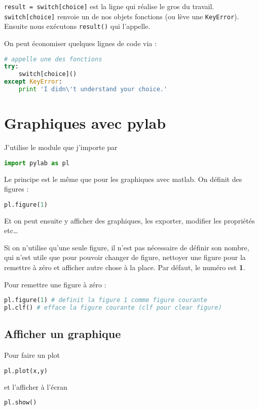 \documentclass[a4paper,twoside]{article}
\begin{document}
\verb|result = switch[choice]| est la ligne qui réalise le gros du travail. \verb|switch[choice]| renvoie un de nos objets fonctions (ou lève une \verb|KeyError|). Ensuite nous exécutons \verb|result()| qui l’appelle.

On peut économiser quelques lignes de code via :
\begin{lstlisting}[language=python]
# appelle une des fonctions
try:
    switch[choice]()
except KeyError:
    print 'I didn\'t understand your choice.'
\end{lstlisting}



\section{Graphiques avec pylab}
J'utilise le module  que j'importe par
\begin{lstlisting}[language=python]
import pylab as pl
\end{lstlisting}

Le principe est le même que pour les graphiques avec matlab. On définit des figures :
\begin{lstlisting}[language=python]
pl.figure(1)
\end{lstlisting}
Et on peut ensuite y afficher des graphiques, les exporter, modifier les propriétés etc\dots

\begin{remarque}
Si on n'utilise qu'une seule figure, il n'est pas nécessaire de définir son nombre, qui n'est utile que pour pouvoir changer de figure, nettoyer une figure pour la remettre à zéro et afficher autre chose à la place. Par défaut, le numéro est \textbf{1}.
\end{remarque}

Pour remettre une figure à zéro :
\begin{lstlisting}[language=python]
pl.figure(1) # definit la figure 1 comme figure courante
pl.clf() # efface la figure courante (clf pour clear figure)
\end{lstlisting}

\subsection{Afficher un graphique}
Pour faire un plot
\begin{lstlisting}[language=python]
pl.plot(x,y)
\end{lstlisting}
et l'afficher à l'écran
\begin{lstlisting}[language=python]
pl.show()
\end{lstlisting}
\end{document}
